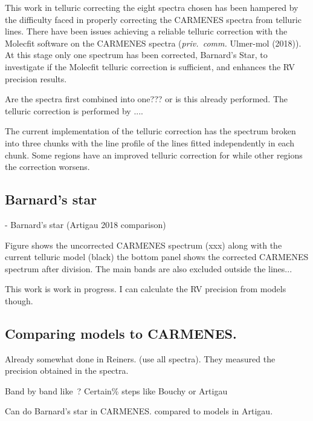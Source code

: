 This work in telluric correcting the eight spectra chosen has been hampered by the difficulty faced in properly correcting the CARMENES spectra from telluric lines.
There have been issues achieving a reliable telluric correction with the Molecfit software on the {CARMENES} spectra (\emph{priv.\ comm.} Ulmer-mol (2018)).
At this stage only one spectrum has been corrected, Barnard's Star, to investigate if the Molecfit telluric correction is sufficient, and enhances the RV precision results.

Are the spectra first combined into one??? or is this already performed.
The telluric correction is performed by ....


The current implementation of the telluric correction has the spectrum broken into three chunks with the line profile of the lines fitted independently in each chunk.
Some regions have an improved telluric correction for while other regions the correction worsens.

\subsection{Barnard's star}
- Barnard's star (Artigau 2018 comparison)

Figure \citep{} shows the uncorrected CARMENES spectrum (xxx) along with the current telluric model (black) the bottom panel shows the corrected CARMENES spectrum after division.
The main \nir{}  bands are also excluded outside the lines...


This work is work in progress.
{I can calculate the {RV} precision from models though.}




\subsection{Comparing models to {CARMENES}.}
Already somewhat done in Reiners.
(use all spectra).
They measured the precision obtained in the spectra.

Band by band like~\citet{figueira_radial_2016}?
Certain\% steps like Bouchy or Artigau


Can do Barnard's star in {CARMENES}.
 compared to models in Artigau.


